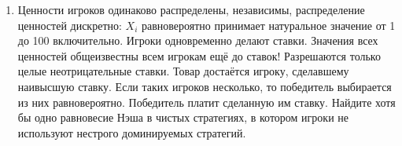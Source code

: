 \begin{enumerate}
\item Ценности игроков одинаково распределены, независимы, распределение ценностей дискретно: $ X_{i}$ равновероятно принимает натуральное значение от 1 до 100 включительно. Игроки одновременно делают ставки. Значения всех ценностей общеизвестны всем игрокам ещё до ставок! Разрешаются только целые неотрицательные ставки. Товар достаётся игроку, сделавшему наивысшую ставку. Если таких игроков несколько, то победитель выбирается из них равновероятно. Победитель платит сделанную им ставку. Найдите хотя бы одно равновесие Нэша в чистых стратегиях, в котором игроки не используют нестрого доминируемых стратегий.


\end{enumerate}
